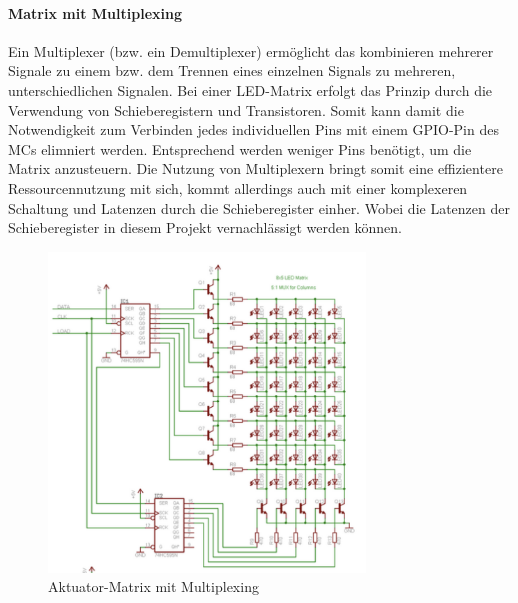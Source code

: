 \paragraph{Matrix mit Multiplexing}
Ein Multiplexer (bzw. ein Demultiplexer) ermöglicht das kombinieren mehrerer Signale zu einem bzw. dem Trennen eines einzelnen Signals zu mehreren, unterschiedlichen Signalen.
Bei einer LED-Matrix erfolgt das Prinzip durch die Verwendung von Schieberegistern und Transistoren.
Somit kann damit die Notwendigkeit zum Verbinden jedes individuellen Pins mit einem GPIO-Pin des \ac{MC}s elimniert werden.
Entsprechend werden weniger Pins benötigt, um die Matrix anzusteuern.
Die Nutzung von Multiplexern bringt somit eine effizientere Ressourcennutzung mit sich, kommt allerdings auch mit einer komplexeren Schaltung und Latenzen durch die Schieberegister einher. %
Wobei die Latenzen der Schieberegister in diesem Projekt vernachlässigt werden können.
\begin{figure}[htbp] %
	\centering
	\includegraphics[width=0.75\textwidth]{img/matrixMuxSchaltung}
	\caption{Aktuator-Matrix mit Multiplexing}
	\label{fig:AktMatrixMux}
\end{figure}

